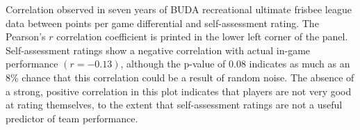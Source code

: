Correlation observed in seven years of BUDA recreational ultimate frisbee league data between points per game differential and self-assessment rating. The Pearson's $r$ correlation coefficient is printed in the lower left corner of the panel. Self-assessment ratings show a negative correlation with actual in-game performance $(r = -0.13)$, although the p-value of 0.08 indicates as much as an 8\% chance that this correlation could be a result of random noise. The absence of a strong, positive correlation in this plot indicates that players are not very good at rating themselves, to the extent that self-assessment ratings are not a useful predictor of team performance. \label{fig:correlation_self}